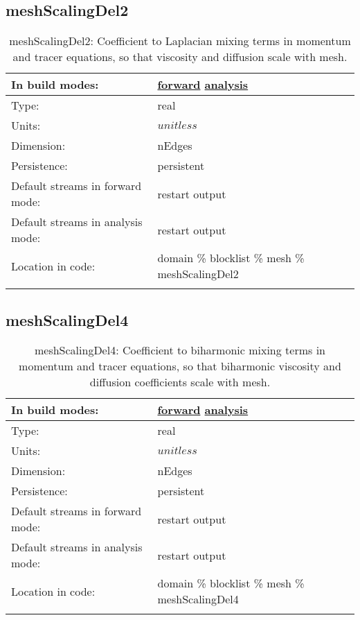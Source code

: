 \subsection[meshScalingDel2]{meshScalingDel2}
\label{subsec:var_sec_mesh_meshScalingDel2}
\begin{center}
\begin{longtable}{| p{2.0in} | p{4.0in} |}
        \hline 
        In build modes: & \hyperref[subsec:forward_var_tab_mesh]{forward} \hyperref[subsec:analysis_var_tab_mesh]{analysis} \\
        \hline 
        Type: & real \\
        \hline 
        Units: & $unitless$ \\
        \hline 
        Dimension: & nEdges \\
        \hline 
        Persistence: & persistent \\
        \hline 
		 Default streams in forward mode: &  restart output \\
        \hline 
		 Default streams in analysis mode: &  restart output \\
        \hline 
		 Location in code: & domain \% blocklist \% mesh \% meshScalingDel2 \\
		 \hline 
    \caption{meshScalingDel2: Coefficient to Laplacian mixing terms in momentum and tracer equations, so that viscosity and diffusion scale with mesh.}
\end{longtable}
\end{center}
\subsection[meshScalingDel4]{meshScalingDel4}
\label{subsec:var_sec_mesh_meshScalingDel4}
\begin{center}
\begin{longtable}{| p{2.0in} | p{4.0in} |}
        \hline 
        In build modes: & \hyperref[subsec:forward_var_tab_mesh]{forward} \hyperref[subsec:analysis_var_tab_mesh]{analysis} \\
        \hline 
        Type: & real \\
        \hline 
        Units: & $unitless$ \\
        \hline 
        Dimension: & nEdges \\
        \hline 
        Persistence: & persistent \\
        \hline 
		 Default streams in forward mode: &  restart output \\
        \hline 
		 Default streams in analysis mode: &  restart output \\
        \hline 
		 Location in code: & domain \% blocklist \% mesh \% meshScalingDel4 \\
		 \hline 
    \caption{meshScalingDel4: Coefficient to biharmonic mixing terms in momentum and tracer equations, so that biharmonic viscosity and diffusion coefficients scale with mesh.}
\end{longtable}
\end{center}
